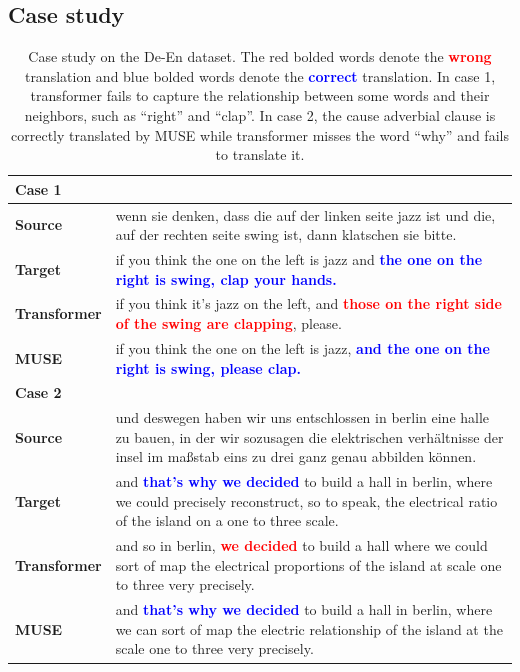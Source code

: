 \documentclass{article} %
\begin{document}
\subsection{Case study}
\begin{table}[ht]
\centering
\begin{tabular}{p{2cm}p{10cm}}
\toprule
\textbf{Case 1} & \\
\midrule
\textbf{Source} & wenn sie denken, dass die auf der linken seite jazz ist und die, auf der rechten seite swing ist, dann klatschen sie bitte. \\
\midrule
\textbf{Target} & if you think the one on the left is jazz and \textbf{\textcolor{blue}{the one on the right is swing, clap your hands.}} \\
\midrule
 \textbf{Transformer} & if you think it's jazz on the left, and \textbf{\textcolor{red}{those on the right side of the swing are clapping}}, please. \\
\midrule
\textbf{MUSE} & if you think the one on the left is jazz, \textbf{\textcolor{blue}{and the one on the right is swing, please clap.}} \\
\midrule\midrule
\textbf{Case 2} & \\
\midrule
\textbf{Source} & und deswegen haben wir uns entschlossen in berlin eine halle zu bauen, in der wir sozusagen die elektrischen verhältnisse der insel im maßstab eins zu drei ganz genau abbilden können. \\
\midrule
\textbf{Target} & and \textbf{\textcolor{blue}{that's why we decided}} to build a hall in berlin, where we could precisely reconstruct, so to speak, the electrical ratio of the island on a one to three scale. \\
\midrule
 \textbf{Transformer} & and so in berlin, \textbf{\textcolor{red}{we decided}} to build a hall where we could sort of map the electrical proportions of the island at scale one to three very precisely. \\
\midrule
\textbf{MUSE} & and \textbf{\textcolor{blue}{that's why we decided}} to build a hall in berlin, where we can sort of map the electric relationship of the island at the scale one to three very precisely. \\
\bottomrule
\end{tabular}
\caption{Case study on the De-En dataset. The red bolded words denote the \textbf{\textcolor{red}{wrong}} translation and blue bolded words denote the \textbf{\textcolor{blue}{correct}} translation. In case 1, transformer fails to capture the relationship between some words and their neighbors, such as ``right'' and ``clap''. In case 2, the cause adverbial clause is correctly translated by MUSE while transformer misses the word ``why'' and fails to translate it. }
\label{tab:case_study}
\end{table}
\end{document}
